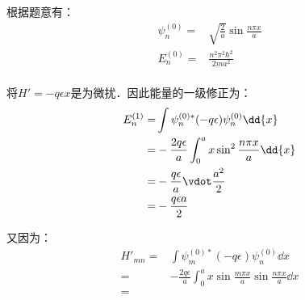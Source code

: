 \subsection{ }
根据题意有：
\begin{equation}
\begin{aligned}
\psi^{(0)}_{n} =& \sqrt{\frac{2}{a}} \sin{\frac{n \pi x}{a}} \\
E^{(0)}_{n} =& \frac{n^{2} \pi^{2} \hbar^{2}}{2ma^{2}} \\
\end{aligned}
\end{equation}

将$H' = -q \epsilon x$是为微扰．因此能量的一级修正为：
\begin{equation}
\begin{aligned}
E^{(1)}_{n} =& \int \psi_{n}^{(0)*} (-q\epsilon) \psi_{n}^{(0)} \dd{x} \\
=& -\frac{2q\epsilon}{a} \int^{a}_{0} x \sin^{2}{\frac{n \pi x}{a}} \dd{x} \\
=& -\frac{q\epsilon}{a} \vdot \frac{a^{2}}{2} \\
=& -\frac{q \epsilon a}{2}
\end{aligned}
\end{equation}

又因为：
\begin{equation}
\begin{aligned}
H'_{mn} =& \int \psi_{m}^{(0)*} (-q\epsilon) \psi_{n}^{(0)} \dd{x} \\
=& -\frac{2q\epsilon}{a} \int^{a}_{0} x \sin{\frac{m \pi x}{a}} \sin{\frac{n \pi x}{a}} \dd{x} \\
=& 
\end{aligned}
\end{equation}


